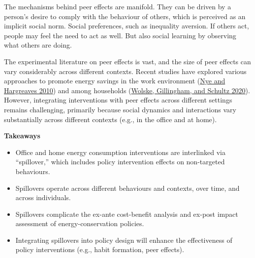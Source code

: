 \documentclass[
  12pt,
  captions=heading]{scrreport}
\begin{document}
The mechanisms behind peer effects are manifold. They can be driven by a
person's desire to comply with the behaviour of others, which is
perceived as an implicit social norm. Social preferences, such as
inequality aversion. If others act, people may feel the need to act as
well. But also social learning by observing what others are doing.

The experimental literature on peer effects is vast, and the size of
peer effects can vary considerably across different contexts. Recent
studies have explored various approaches to promote energy savings in
the work environment (\protect\hyperlink{ref-nye2010exploring}{Nye and
Hargreaves 2010}) and among households
(\protect\hyperlink{ref-wolske2020peer}{Wolske, Gillingham, and Schultz
2020}). However, integrating interventions with peer effects across
different settings remains challenging, primarily because social
dynamics and interactions vary substantially across different contexts
(e.g., in the office and at home).

\textbf{Takeaways}

\begin{itemize}
\item
  Office and home energy consumption interventions are interlinked via
  ``spillover,'' which includes policy intervention effects on
  non-targeted behaviours.
\item
  Spillovers operate across different behaviours and contexts, over
  time, and across individuals.
\item
  Spillovers complicate the ex-ante cost-benefit analysis and ex-post
  impact assessment of energy-conservation policies.
\item
  Integrating spillovers into policy design will enhance the
  effectiveness of policy interventions (e.g., habit formation, peer
  effects).
\end{itemize}
\end{document}

